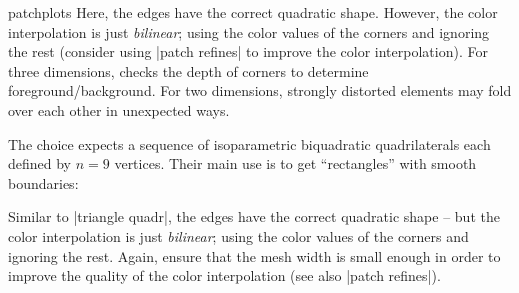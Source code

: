 {\begin{pgfplotslibrary}{patchplots}
\noindent Here, the edges have the correct quadratic shape. However, the color
interpolation is just \emph{bilinear}; using the color values of the corners
and ignoring the rest (consider using |patch refines| to improve the color
interpolation). For three dimensions, \PGFPlots{} checks the depth of corners
to determine foreground/background. For two dimensions, strongly distorted
elements may fold over each other in unexpected ways.

The choice  expects a sequence of isoparametric
biquadratic quadrilaterals each defined by $n=9$ vertices. Their main use is to
get ``rectangles'' with smooth boundaries:
%
\begin{codeexample}[]
\end{codeexample}

\begin{codeexample}[]
\end{codeexample}
%
\noindent Similar to |triangle quadr|, the edges have the correct quadratic
shape -- but the color interpolation is just \emph{bilinear}; using the color
values of the corners and ignoring the rest. Again, ensure that the mesh width
is small enough in order to improve the quality of the color interpolation (see
also |patch refines|).


\end{pgfplotslibrary}}
